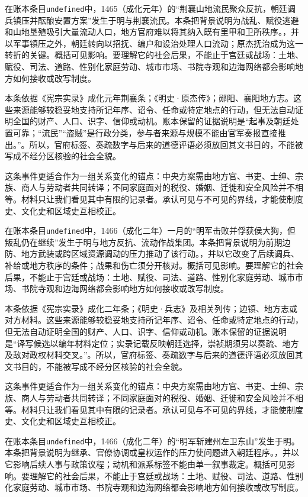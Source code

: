 在账本条目\texttt{undefined}中，1465（成化元年）的“荆襄山地流民聚众反抗，朝廷调兵镇压并酝酿安置方案”发生于明与荆襄流民。本条把背景说明为战乱、赋役逃避和山地垦殖吸引大量流动人口，地方官府难以将其纳入既有里甲和卫所秩序。，并以军事镇压之外，朝廷转向以招抚、编户和设治处理人口流动；原杰抚治成为这一转折的关键。概括可见影响。要理解它的社会后果，不能止于宫廷或战场：土地、赋役、司法、道路、性别化家庭劳动、城市市场、书院寺观和边海网络都会影响地方如何接收或改写制度。

本条依据《宪宗实录》成化元年荆襄条；《明史·原杰传》；郧阳、襄阳地方志。这些来源能够较稳妥地支持所记年序、诏令、任命或特定地点的行动，但无法自动证明全国的财产、人口、识字、信仰或动机。账本保留的证据说明是“起事及朝廷处置可靠；“流民”“盗贼”是行政分类，参与者来源与规模不能由官军奏报直接推出。”。所以，官府标签、奏疏数字与后来的道德评语必须放回其文书目的，不能被写成不经分区核验的社会全貌。

这条事件更适合作为一组关系变化的锚点：中央方案需由地方官、书吏、士绅、宗族、商人与劳动者共同转译；不同家庭面对的税役、婚姻、迁徙和安全风险并不相等。材料只让我们看见其中有限的记录者。承认可见与不可见的界线，才能使制度史、文化史和区域史互相校正。

在账本条目\texttt{undefined}中，1466（成化二年）一月的“明军击败并俘获侯大狗，但叛乱仍在继续”发生于明与地方反抗、流动作战集团。本条把背景说明为前期边防、地方武装或跨区域资源调动的压力推动了该行动。，并以它改变了后续调兵、补给或地方秩序的条件；战果和伤亡须分开核对。概括可见影响。要理解它的社会后果，不能止于宫廷或战场：土地、赋役、司法、道路、性别化家庭劳动、城市市场、书院寺观和边海网络都会影响地方如何接收或改写制度。

本条依据《宪宗实录》成化二年条；《明史·兵志》及相关列传；边镇、地方志或对方材料。这些来源能够较稳妥地支持所记年序、诏令、任命或特定地点的行动，但无法自动证明全国的财产、人口、识字、信仰或动机。账本保留的证据说明是“译写候选以编年材料定位；实录记载反映朝廷选择，崇祯期须另以奏疏、地方及敌对政权材料交叉。”。所以，官府标签、奏疏数字与后来的道德评语必须放回其文书目的，不能被写成不经分区核验的社会全貌。

这条事件更适合作为一组关系变化的锚点：中央方案需由地方官、书吏、士绅、宗族、商人与劳动者共同转译；不同家庭面对的税役、婚姻、迁徙和安全风险并不相等。材料只让我们看见其中有限的记录者。承认可见与不可见的界线，才能使制度史、文化史和区域史互相校正。

在账本条目\texttt{undefined}中，1466（成化二年）的“明军斩建州左卫东山”发生于明。本条把背景说明为继承、官僚协调或皇权运作的压力使问题进入朝廷程序。，并以它影响后续人事与政策议程；动机和派系标签不能由单一叙事裁定。概括可见影响。要理解它的社会后果，不能止于宫廷或战场：土地、赋役、司法、道路、性别化家庭劳动、城市市场、书院寺观和边海网络都会影响地方如何接收或改写制度。

